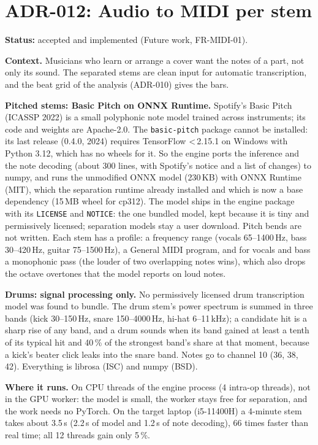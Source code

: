 \section{ADR-012: Audio to MIDI per stem}
\textbf{Status:} accepted and implemented (Future work, FR-MIDI-01).

\textbf{Context.} Musicians who learn or arrange a cover want the notes of a
part, not only its sound. The separated stems are clean input for automatic
transcription, and the beat grid of the analysis (ADR-010) gives the bars.

\textbf{Pitched stems: Basic Pitch on ONNX Runtime.} Spotify's Basic Pitch
(ICASSP 2022) is a small polyphonic note model trained across instruments;
its code and weights are Apache-2.0. The \texttt{basic-pitch} package cannot
be installed: its last release (0.4.0, 2024) requires TensorFlow
\textless\,2.15.1 on Windows with Python 3.12, which has no wheels for it. So
the engine ports the inference and the note decoding (about 300 lines, with
Spotify's notice and a list of changes) to numpy, and runs the unmodified
ONNX model (230\,KB) with ONNX Runtime (MIT), which the separation runtime
already installed and which is now a base dependency (15\,MB wheel for
cp312). The model ships in the engine package with its \texttt{LICENSE} and
\texttt{NOTICE}: the one bundled model, kept because it is tiny and
permissively licensed; separation models stay a user download. Pitch bends
are not written. Each stem has a profile: a frequency range (vocals 65--1400\,Hz,
bass 30--420\,Hz, guitar 75--1500\,Hz), a General MIDI program, and for
vocals and bass a monophonic pass (the louder of two overlapping notes wins),
which also drops the octave overtones that the model reports on loud notes.

\textbf{Drums: signal processing only.} No permissively licensed drum
transcription model was found to bundle. The drum stem's power spectrum is
summed in three bands (kick 30--150\,Hz, snare 150--4000\,Hz, hi-hat
6--11\,kHz); a candidate hit is a sharp rise of any band, and a drum sounds
when its band gained at least a tenth of its typical hit and 40\,\% of the
strongest band's share at that moment, because a kick's beater click leaks
into the snare band. Notes go to channel 10 (36, 38, 42). Everything is
librosa (ISC) and numpy (BSD).

\textbf{Where it runs.} On CPU threads of the engine process (4 intra-op
threads), not in the GPU worker: the model is small, the worker stays free for
separation, and the work needs no PyTorch. On the target laptop
(i5-11400H) a 4-minute stem takes about 3.5\,s (2.2\,s of model and 1.2\,s of
note decoding), 66 times faster than real time; all 12 threads gain only
5\,\%.

